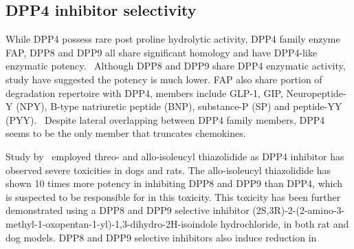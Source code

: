 \subsection{DPP4 inhibitor selectivity}
While DPP4 possess rare post proline hydrolytic activity, DPP4 family enzyme FAP, DPP8 and DPP9 all share significant homology and have DPP4-like enzymatic potency.~\cite{Kirby_2010,Thornberry_2007} Although DPP8 and DPP9 share DPP4 enzymatic activity, study have suggested the potency is much lower. FAP also share portion of degradation repertoire with DPP4, members include GLP-1, GIP, Neuropeptide-Y (NPY), B-type natriuretic peptide (BNP), substance-P (SP) and peptide-YY (PYY).~\cite{Keane_2011} Despite lateral overlapping between DPP4 family members, DPP4 seems to be the only member that truncates chemokines.~\cite{Keane_2011}  
\par 
Study by~\citet{Lankas2005} employed threo- and allo-isoleucyl thiazolidide as DPP4 inhibitor has observed severe toxicities in dogs and rats. The allo-isoleucyl thiazolidide has shown 10 times more potency in inhibiting DPP8 and DPP9 than DPP4, which is suspected to be responsible for in this toxicity. This toxicity has been further demonstrated using a DPP8 and DPP9 selective inhibitor (2S,3R)-2-(2-amino-3-methyl-1-oxopentan-1-yl)-1,3-dihydro-2H-isoindole hydrochloride, in both rat and dog models. DPP8 and DPP9 selective inhibitors also induce reduction in  